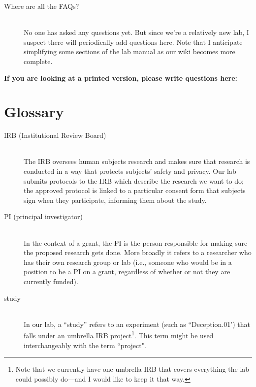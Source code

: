 \documentclass[letterpaper,12pt,oneside]{memoir}
\begin{document}
{\begin{description}
\item[Where are all the FAQs?] \hfill \\
No one has asked any questions yet. But since we're a relatively new lab, I suspect there will periodically add questions here. Note that I anticipate simplifying some sections of the lab manual as our wiki becomes more complete.


\end{description}

\vspace{.2in}
\noindent \textbf{\large If you are looking at a printed version, please write questions here:}


%

\chapter{Glossary}

\begin{description}

\item[IRB (Institutional Review Board)] \hfill \\
The IRB oversees human subjects research and makes sure that research is conducted in a way that protects subjects' safety and privacy. Our lab submits protocols to the IRB which describe the research we want to do; the approved protocol is linked to a particular consent form that subjects sign when they participate, informing them about the study.

\item[PI (principal investigator)] \hfill \\
In the context of a grant, the PI is the person responsible for making sure the proposed research gets done. More broadly it refers to a researcher who has their own research group or lab (i.e., someone who would be in a position to be a PI on a grant, regardless of whether or not they are currently funded).

\item[study] \hfill \\
In our lab, a ``study'' refers to an experiment (such as ``Deception.01') that falls under an umbrella IRB project\footnote{Note that we currently have one umbrella IRB that covers everything the lab could possibly do---and I would like to keep it that way.}. This term might be used interchangeably with the term ``project". 


\end{description}}
\end{document}
